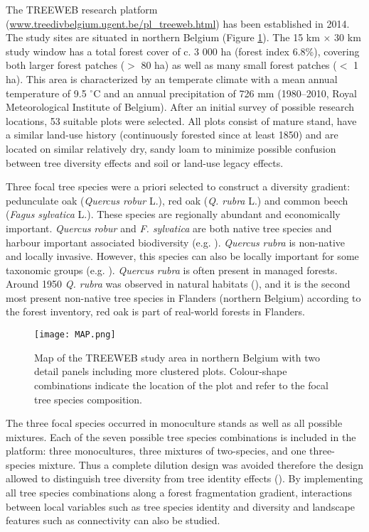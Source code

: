\documentclass[b5paper,10pt]{book} %
\begin{document}
	The TREEWEB research platform (\url{www.treedivbelgium.ugent.be/pl\_treeweb.html}) has been established in 2014. The study sites are situated in northern Belgium (Figure \ref{FigB.1}). The 15 km $\times$ 30 km study window has a total forest cover of c. 3 000 ha (forest index 6.8\%), covering both larger forest patches ($>$ 80 ha) as well as many small forest patches ($<$ 1 ha). This area is characterized by an temperate climate with a mean annual temperature of  9.5 $^\circ$C and an annual precipitation of 726 mm (1980--2010, Royal Meteorological Institute of Belgium). After an initial survey of possible research locations, 53 suitable plots were selected. All plots consist of mature stand, have a similar land-use history (continuously forested since at least 1850) and are located on similar relatively dry, sandy loam to minimize possible confusion between tree diversity effects and soil or land-use legacy effects.

	Three focal tree species were a priori selected to construct a diversity gradient: pedunculate oak (\textit{Quercus robur} L.), red oak (\textit{Q. rubra} L.) and common beech (\textit{Fagus sylvatica} L.). These species are regionally abundant and economically important. \textit{Quercus} \textit{robur} and \textit{F. sylvatica} are both native tree species and harbour important associated biodiversity (e.g. \citealt{Brandle2001}). \textit{Quercus} \textit{rubra} is non-native and locally invasive. However, this species can also be locally important for some taxonomic groups (e.g. \citealt{Dekeukeleire2014}). \textit{Quercus} \textit{rubra} is often present in managed forests. Around 1950 \textit{Q. rubra} was observed in natural habitats (\citealt{Branquart2007}), and it is the second most present non-native tree species in Flanders (northern Belgium) according to the forest inventory, red oak is part of real-world forests in Flanders. 

	\begin{figure}[t!]
		\begin{center}
			\texttt{[image: MAP.png]}
		\end{center}
			\caption{Map of the TREEWEB study area in northern Belgium with two detail panels including more clustered plots. Colour-shape combinations indicate the location of the plot and refer to the focal tree species composition. \label{FigB.1}}
	\end{figure}

	The three focal species occurred in monoculture stands as well as all possible mixtures. Each of the seven possible tree species combinations is included in the platform: three monocultures, three mixtures of two-species, and one three-species mixture. Thus a complete dilution design was avoided therefore the design allowed to distinguish tree diversity from tree identity effects (\citealt{Baeten2013}). By implementing all tree species combinations along a forest fragmentation gradient, interactions between local variables such as tree species identity and diversity and landscape features such as connectivity can also be studied.
\end{document}
